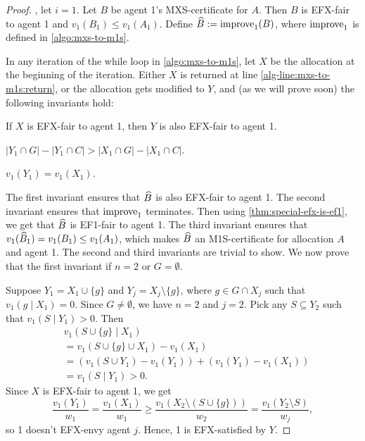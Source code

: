 \begin{proof}
\WLoG{}, let $i=1$. Let $B$ be agent 1's MXS-certificate for $A$.
Then $B$ is EFX-fair to agent 1 and $v_1(B_1) \le v_1(A_1)$.
Define $\widehat{B} := \operatorname{improve}_1(B)$, where $\operatorname{improve}_1$ is defined in \cref{algo:mxs-to-m1s}.

In any iteration of the while loop in \cref{algo:mxs-to-m1s},
let $X$ be the allocation at the beginning of the iteration.
Either $X$ is returned at line \ref{alg-line:mxs-to-m1s:return},
or the allocation gets modified to $Y$, and (as we will prove soon) the following invariants hold:
\begin{tightenum}
\item If $X$ is EFX-fair to agent 1, then $Y$ is also EFX-fair to agent 1.
\item $|Y_1 \cap G| - |Y_1 \cap C| > |X_1 \cap G| - |X_1 \cap C|$.
\item $v_1(Y_1) = v_1(X_1)$.
\end{tightenum}
The first invariant ensures that $\widehat{B}$ is also EFX-fair to agent 1.
The second invariant ensures that $\operatorname{improve}_1$ terminates.
Then using \cref{thm:special-efx-is-ef1}, we get that $\widehat{B}$ is EF1-fair to agent 1.
The third invariant ensures that $v_1(\widehat{B}_1) = v_1(B_1) \le v_1(A_1)$,
which makes $\widehat{B}$ an M1S-certificate for allocation $A$ and agent 1.
The second and third invariants are trivial to show.
We now prove that the first invariant if $n = 2$ or $G = \emptyset$.

Suppose $Y_1 = X_1 \cup \{g\}$ and $Y_j = X_j \setminus \{g\}$,
where $g \in G \cap X_j$ such that $v_1(g \mid X_1) = 0$.
Since $G \neq \emptyset$, we have $n = 2$ and $j = 2$.
Pick any $S \subseteq Y_2$ such that $v_1(S \mid Y_1) > 0$. Then
\begin{align*}
& v_1(S \cup \{g\} \mid X_1)
\\ &= v_1(S \cup \{g\} \cup X_1) - v_1(X_1)
\\ &= (v_1(S \cup Y_1) - v_1(Y_1)) + (v_1(Y_1) - v_1(X_1))
\\ &= v_1(S \mid Y_1) > 0.
\end{align*}
Since $X$ is EFX-fair to agent 1, we get
\[ \frac{v_1(Y_1)}{w_1} = \frac{v_1(X_1)}{w_1}
    \ge \frac{v_1(X_2 \setminus (S \cup \{g\}))}{w_2}
    = \frac{v_1(Y_2 \setminus S)}{w_j}, \]
so 1 doesn't EFX-envy agent $j$. Hence, 1 is EFX-satisfied by $Y$.


\end{proof}
